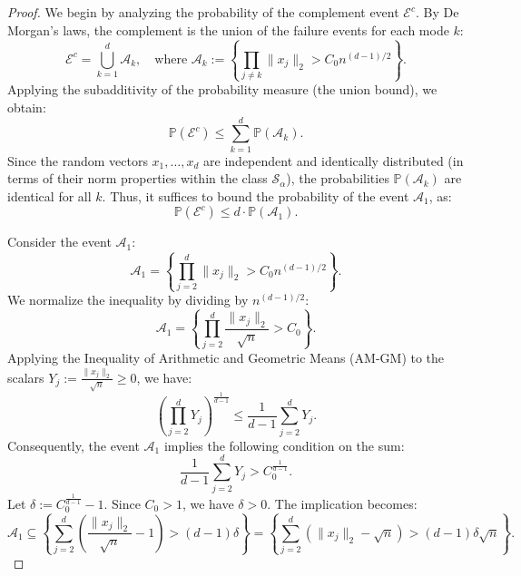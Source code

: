 \documentclass[11pt]{amsart}
\theoremstyle{definition}
\theoremstyle{remark}
\begin{document}
\begin{proof}
We begin by analyzing the probability of the complement event $\mathcal{E}^c$. By De Morgan's laws, the complement is the union of the failure events for each mode $k$:
\begin{equation}
\mathcal{E}^c = \bigcup_{k=1}^d \mathcal{A}_k, \quad \text{where } \mathcal{A}_k := \left\{ \prod_{j \neq k} \|x_j\|_2 > C_0 n^{(d-1)/2} \right\}.
\end{equation}
Applying the subadditivity of the probability measure (the union bound), we obtain:
\begin{equation}
\mathbb{P}(\mathcal{E}^c) \le \sum_{k=1}^d \mathbb{P}(\mathcal{A}_k).
\end{equation}
Since the random vectors $x_1, \dots, x_d$ are independent and identically distributed (in terms of their norm properties within the class $\mathcal{S}_{\alpha}$), the probabilities $\mathbb{P}(\mathcal{A}_k)$ are identical for all $k$. Thus, it suffices to bound the probability of the event $\mathcal{A}_1$, as:
\begin{equation}
\mathbb{P}(\mathcal{E}^c) \le d \cdot \mathbb{P}(\mathcal{A}_1).
\end{equation}

Consider the event $\mathcal{A}_1$:
\begin{equation}
\mathcal{A}_1 = \left\{ \prod_{j=2}^d \|x_j\|_2 > C_0 n^{(d-1)/2} \right\}.
\end{equation}
We normalize the inequality by dividing by $n^{(d-1)/2}$:
\begin{equation}
\mathcal{A}_1 = \left\{ \prod_{j=2}^d \frac{\|x_j\|_2}{\sqrt{n}} > C_0 \right\}.
\end{equation}
Applying the Inequality of Arithmetic and Geometric Means (AM-GM) to the scalars $Y_j := \frac{\|x_j\|_2}{\sqrt{n}} \ge 0$, we have:
\begin{equation}
\left( \prod_{j=2}^d Y_j \right)^{\frac{1}{d-1}} \le \frac{1}{d-1} \sum_{j=2}^d Y_j.
\end{equation}
Consequently, the event $\mathcal{A}_1$ implies the following condition on the sum:
\begin{equation}
\frac{1}{d-1} \sum_{j=2}^d Y_j > C_0^{\frac{1}{d-1}}.
\end{equation}
Let $\delta := C_0^{\frac{1}{d-1}} - 1$. Since $C_0 > 1$, we have $\delta > 0$. The implication becomes:
\begin{equation}
\mathcal{A}_1 \subseteq \left\{ \sum_{j=2}^d \left( \frac{\|x_j\|_2}{\sqrt{n}} - 1 \right) > (d-1)\delta \right\} = \left\{ \sum_{j=2}^d (\|x_j\|_2 - \sqrt{n}) > (d-1)\delta \sqrt{n} \right\}.
\end{equation}


\end{proof}
\end{document}
